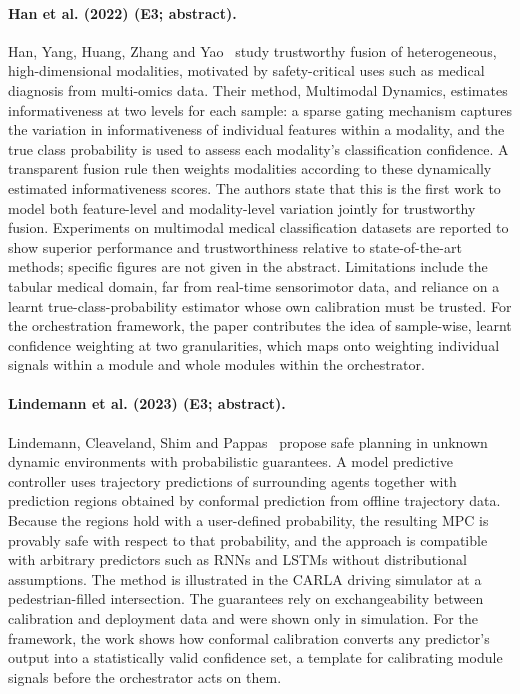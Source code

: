 \documentclass[10pt,a4paper]{article}
\begin{document}
\paragraph{Han et al. (2022) (E3; abstract).} Han, Yang, Huang, Zhang and Yao~\cite{Han2022b} study trustworthy fusion of heterogeneous, high-dimensional modalities, motivated by safety-critical uses such as medical diagnosis from multi-omics data. Their method, Multimodal Dynamics, estimates informativeness at two levels for each sample: a sparse gating mechanism captures the variation in informativeness of individual features within a modality, and the true class probability is used to assess each modality's classification confidence. A transparent fusion rule then weights modalities according to these dynamically estimated informativeness scores. The authors state that this is the first work to model both feature-level and modality-level variation jointly for trustworthy fusion. Experiments on multimodal medical classification datasets are reported to show superior performance and trustworthiness relative to state-of-the-art methods; specific figures are not given in the abstract. Limitations include the tabular medical domain, far from real-time sensorimotor data, and reliance on a learnt true-class-probability estimator whose own calibration must be trusted. For the orchestration framework, the paper contributes the idea of sample-wise, learnt confidence weighting at two granularities, which maps onto weighting individual signals within a module and whole modules within the orchestrator.

\paragraph{Lindemann et al. (2023) (E3; abstract).} Lindemann, Cleaveland, Shim and Pappas~\cite{Lindemann2023} propose safe planning in unknown dynamic environments with probabilistic guarantees. A model predictive controller uses trajectory predictions of surrounding agents together with prediction regions obtained by conformal prediction from offline trajectory data. Because the regions hold with a user-defined probability, the resulting MPC is provably safe with respect to that probability, and the approach is compatible with arbitrary predictors such as RNNs and LSTMs without distributional assumptions. The method is illustrated in the CARLA driving simulator at a pedestrian-filled intersection. The guarantees rely on exchangeability between calibration and deployment data and were shown only in simulation. For the framework, the work shows how conformal calibration converts any predictor's output into a statistically valid confidence set, a template for calibrating module signals before the orchestrator acts on them.
\end{document}
